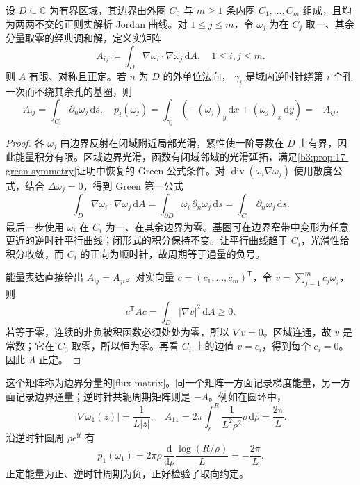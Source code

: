 \begin{proposition}[通量矩阵的正定性]\label{b3:prop:17-flux-matrix}
设 \(D\subseteq\mathbb C\) 为有界区域，其边界由外圈 \(C_0\) 与
\(m\ge1\) 条内圈 \(C_1,\ldots,C_m\) 组成，且均为两两不交的正则实解析
Jordan 曲线。对 \(1\le j\le m\)，令 \(\omega_j\) 为在 \(C_j\) 取一、其余分量取零的经典调和解，定义实矩阵
\[
 A_{ij}\coloneqq
 \int_D\nabla\omega_i\cdot\nabla\omega_j\,\mathrm dA,
 \quad 1\le i,j\le m.
\]
则 \(A\) 有限、对称且正定。若 \(n\) 为 \(D\) 的外单位法向，
\(\gamma_i\) 是域内逆时针绕第 \(i\) 个孔一次而不绕其余孔的基圈，则
\[
 A_{ij}=\int_{C_i}\partial_n\omega_j\,\mathrm ds,
 \quad
 p_i(\omega_j)
 =\int_{\gamma_i}(-(\omega_j)_y\,\mathrm dx+(\omega_j)_x\,\mathrm dy)
 =-A_{ij}.
\]
\end{proposition}
\begin{proof}
各 \(\omega_j\) 由边界反射在闭域附近局部光滑，紧性使一阶导数在
\(\overline D\) 上有界，因此能量积分有限。区域边界光滑，函数有闭域邻域的光滑延拓，满足\cref{b3:prop:17-green-symmetry}证明中恢复的 Green 公式条件。对
\(\operatorname{div}(\omega_i\nabla\omega_j)\) 使用散度公式，结合
\(\Delta\omega_j=0\)，得到 Green 第一公式
\[
 \int_D\nabla\omega_i\cdot\nabla\omega_j\,\mathrm dA
 =\int_{\partial D}\omega_i\,\partial_n\omega_j\,\mathrm ds
 =\int_{C_i}\partial_n\omega_j\,\mathrm ds.
\]
最后一步使用 \(\omega_i\) 在 \(C_i\) 为一、在其余边界为零。基圈可在边界窄带中变形为任意更近的逆时针平行曲线；闭形式的积分保持不变。让平行曲线趋于
\(C_i\)，光滑性给积分收敛，而 \(C_i\) 的正向为顺时针，故周期等于通量的负号。

能量表达直接给出 \(A_{ij}=A_{ji}\)。对实向量
\(c=(c_1,\ldots,c_m)^{\mathsf T}\)，令 \(v=\sum_{j=1}^m c_j\omega_j\)，则
\[
 c^{\mathsf T}Ac=\int_D|\nabla v|^2\,\mathrm dA\ge0.
\]
若等于零，连续的非负被积函数必须处处为零，所以 \(\nabla v=0\)。区域连通，故 \(v\) 是常数；它在 \(C_0\) 取零，所以恒为零。再看
\(C_i\) 上的边值 \(v=c_i\)，得到每个 \(c_i=0\)。因此 \(A\) 正定。
\end{proof}

这个矩阵称为边界分量的[flux matrix]。同一个矩阵一方面记录梯度能量，另一方面记录边界通量；逆时针共轭周期矩阵则是
\(-A\)。例如在圆环中，
\[
 |\nabla\omega_1(z)|=\frac1{L|z|},
 \quad
 A_{11}=2\pi\int_r^R\frac1{L^2\rho^2}\rho\,\mathrm d\rho
 =\frac{2\pi}{L}.
\]
沿逆时针圆周 \(\rho e^{\mathrm i t}\) 有
\[
 p_1(\omega_1)=2\pi\rho\,\frac{\mathrm d}{\mathrm d\rho}
                \frac{\log(R/\rho)}{L}
 =-\frac{2\pi}{L}.
\]
正定能量为正、逆时针周期为负，正好检验了取向约定。

